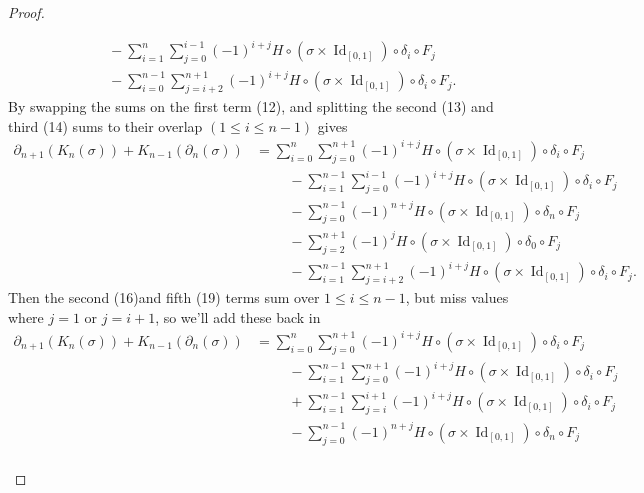 \documentclass{article}
\newcommand{\id}[1]{\operatorname{Id}_{#1}}
\begin{document}
\begin{proof}
\begin{enumerate}[a.]
\begin{align}
      &\hspace{1cm}- \sum_{i=1}^{n}\sum_{j=0}^{i-1} (-1)^{i+j} H\circ(\sigma \times \id{[0,1]}) \circ \delta_i \circ F_j \\
      &\hspace{1cm}- \sum_{i=0}^{n-1}\sum_{j=i+2}^{n+1} (-1)^{i+j} H\circ(\sigma \times \id{[0,1]}) \circ \delta_i \circ F_j.
    \end{align}
    By swapping the sums on the first term (12), and splitting the second (13) and third (14)
    sums to their overlap $(1 \leq i \leq n-1)$ gives \begin{align}
      \partial_{n+1}(K_n(\sigma)) + K_{n-1}(\partial_{n}(\sigma))
      &= \sum_{i=0}^{n}\sum_{j=0}^{n+1} (-1)^{i + j} H\circ(\sigma \times \id{[0,1]}) \circ \delta_i \circ F_j \\
      &\hspace{1cm}- \sum_{i=1}^{n-1}\sum_{j=0}^{i-1} (-1)^{i+j} H\circ(\sigma \times \id{[0,1]}) \circ \delta_i \circ F_j \\
      &\hspace{1cm}- \sum_{j=0}^{n-1} (-1)^{n+j} H\circ(\sigma \times \id{[0,1]}) \circ \delta_n \circ F_j \\
      &\hspace{1cm}- \sum_{j=2}^{n+1} (-1)^{j} H\circ(\sigma \times \id{[0,1]}) \circ \delta_0 \circ F_j\\
      &\hspace{1cm}- \sum_{i=1}^{n-1}\sum_{j=i+2}^{n+1} (-1)^{i+j} H\circ(\sigma \times \id{[0,1]}) \circ \delta_i \circ F_j.
    \end{align}
    Then the second (16)and fifth (19) terms sum over $1 \leq i \leq n - 1$, but miss
    values where $j = 1$ or $j = i + 1$, so we'll add these back in \begin{align}
      \partial_{n+1}(K_n(\sigma)) + K_{n-1}(\partial_{n}(\sigma))
      &= \sum_{i=0}^{n}\sum_{j=0}^{n+1} (-1)^{i + j} H\circ(\sigma \times \id{[0,1]}) \circ \delta_i \circ F_j \\
      &\hspace{1cm}- \sum_{i=1}^{n-1}\sum_{j=0}^{n+1} (-1)^{i+j} H\circ(\sigma \times \id{[0,1]}) \circ \delta_i \circ F_j \\
      &\hspace{1cm}+ \sum_{i=1}^{n-1}\sum_{j=i}^{i+1} (-1)^{i+j} H\circ(\sigma \times \id{[0,1]}) \circ \delta_i \circ F_j \\
      &\hspace{1cm}- \sum_{j=0}^{n-1} (-1)^{n+j} H\circ(\sigma \times \id{[0,1]}) \circ \delta_n \circ F_j \\

\end{align}
\end{enumerate}
\end{proof}
\end{document}
